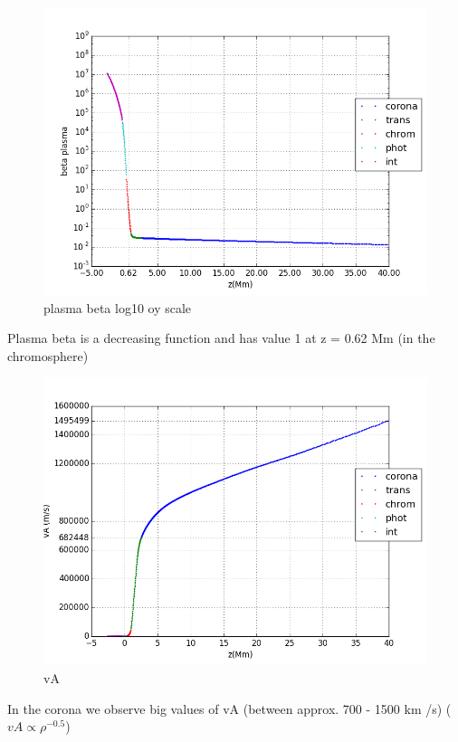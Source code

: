 \documentclass[10pt]{book}
\begin{document}
\begin{figure}[H]
 \centering
 \includegraphics[scale=0.5]{fromFileLogScale3.png}
 \caption{plasma beta log10 oy scale}
\end{figure}

Plasma beta is a decreasing function and has value 1 at z = 0.62 Mm (in the chromosphere) 

\begin{figure}[H]
 \centering
 \includegraphics[scale=0.5]{fromFile4.png}
 \caption{vA}
\end{figure}

In the corona  we observe big values of vA  (between approx. 700 - 1500 km /s) ($vA \propto \rho^{-0.5}$) 
\end{document}
